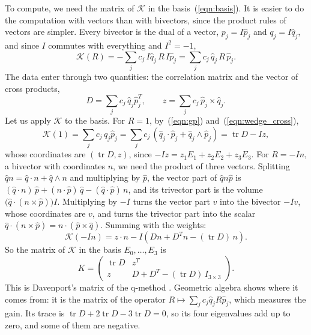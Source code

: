 \documentclass{birkjour}
\theoremstyle{definition}
\theoremstyle{remark}
\numberwithin{equation}{section}
\newcommand{\K}{\mathcal{K}}
\newcommand{\tr}{\operatorname{tr}}
\begin{document}
To compute, we need the matrix of $\K$ in the basis~(\ref{eqn:basis}). It is easier to do the computation with vectors than with bivectors, since the product rules of vectors are simpler. Every bivector is the dual of a vector, $p_j = I \hat p_j$ and $q_j = I \hat q_j$, and since $I$ commutes with everything and $I^2 = -1$,
\begin{equation}
\label{eqn:operator_vectors}
\K(R) = -\sum_j c_j\, I \hat q_j\, R\, I \hat p_j = \sum_j c_j\, \hat q_j\, R\, \hat p_j.
\end{equation}
The data enter through two quantities: the correlation matrix and the vector of cross products,
\begin{equation}
\label{eqn:correlation}
D = \sum_j c_j\, \hat q_j \hat p_j^T, \qquad z = \sum_j c_j\, \hat p_j \times \hat q_j.
\end{equation}
Let us apply $\K$ to the basis. For $R = 1$, by~(\ref{eqn:gp}) and~(\ref{eqn:wedge_cross}),
\begin{equation*}
\K(1) = \sum_j c_j\, \hat q_j \hat p_j = \sum_j c_j\, (\hat q_j \cdot \hat p_j + \hat q_j \wedge \hat p_j) = \tr D - I z,
\end{equation*}
whose coordinates are $(\tr D, z)$, since $-I z = z_1 E_1 + z_2 E_2 + z_3 E_3$. For $R = -I n$, a bivector with coordinates $n$, we need the product of three vectors. Splitting $\hat q n = \hat q \cdot n + \hat q \wedge n$ and multiplying by $\hat p$, the vector part of $\hat q n \hat p$ is $(\hat q \cdot n)\, \hat p + (n \cdot \hat p)\, \hat q - (\hat q \cdot \hat p)\, n$, and its trivector part is the volume $\big(\hat q \cdot (n \times \hat p)\big) I$. Multiplying by $-I$ turns the vector part $v$ into the bivector $-I v$, whose coordinates are $v$, and turns the trivector part into the scalar $\hat q \cdot (n \times \hat p) = n \cdot (\hat p \times \hat q)$. Summing with the weights:
\begin{equation*}
\K(-I n) = z \cdot n - I \left( D n + D^T n - (\tr D)\, n \right).
\end{equation*}
So the matrix of $\K$ in the basis $E_0, \ldots, E_3$ is
\begin{equation}
\label{eqn:matrix}
K = \begin{pmatrix} \tr D & z^T \\ z & D + D^T - (\tr D)\, I_{3\times3} \end{pmatrix}.
\end{equation}
This is Davenport's matrix of the q-method \cite{Davenport1968, Shuster1981}. Geometric algebra shows where it comes from: it is the matrix of the operator $R \mapsto \sum_j c_j \hat q_j R \hat p_j$, which measures the gain. Its trace is $\tr D + 2 \tr D - 3 \tr D = 0$, so its four eigenvalues add up to zero, and some of them are negative.
\end{document}

